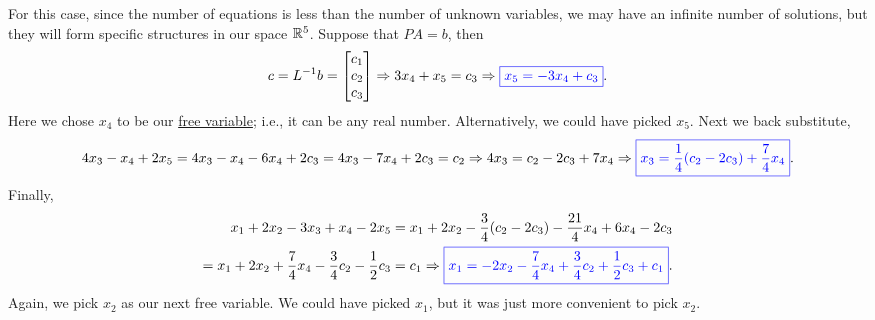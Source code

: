 \documentclass[reqno]{amsart}
\theoremstyle{definition}
\begin{document}
\begin{enumerate}
For this case, since the number of equations is less than the number of unknown variables, we may have an infinite number of solutions, but they will form specific structures in our space $\mathbb{R}^5$.  Suppose that $PA = b$, then
%
\begin{equation*}
c = L^{-1}b = \begin{bmatrix}
c_1\\
c_2\\
c_3
\end{bmatrix} \Rightarrow 3x_4 + x_5 = c_3 \Rightarrow {\color{blue}\boxed{x_5 = -3x_4 + c_3}}.
\end{equation*}
%
Here we chose $x_4$ to be our {\color{red}\underline{free variable}}; i.e., it can be any real number.  Alternatively, we could have picked $x_5$.  Next we back substitute,
%
\begin{equation*}
4x_3 - x_4 + 2x_5 = 4x_3 - x_4 - 6x_4 + 2c_3 = 4x_3 - 7x_4 + 2c_3 = c_2 \Rightarrow 4x_3 = c_2 - 2c_3 + 7x_4 \Rightarrow {\color{blue}\boxed{x_3 = \frac{1}{4}(c_2-2c_3) + \frac{7}{4}x_4}}.
\end{equation*}
%
Finally,
%
\begin{align*}
x_1 + 2x_2 - 3x_3 + x_4 - 2x_5 = x_1 + 2x_2 - \frac{3}{4}(c_2 - 2c_3) - \frac{21}{4}x_4 + 6x_4 - 2c_3\\
= x_1 + 2x_2 + \frac{7}{4}x_4 - \frac{3}{4}c_2 - \frac{1}{2}c_3 = c_1
\Rightarrow {\color{blue}\boxed{x_1 = -2x_2 - \frac{7}{4}x_4 + \frac{3}{4}c_2 + \frac{1}{2}c_3 + c_1}}.
\end{align*}
%
Again, we pick $x_2$ as our next free variable.  We could have picked $x_1$, but it was just more convenient to pick $x_2$.

\end{enumerate}
\end{document}
